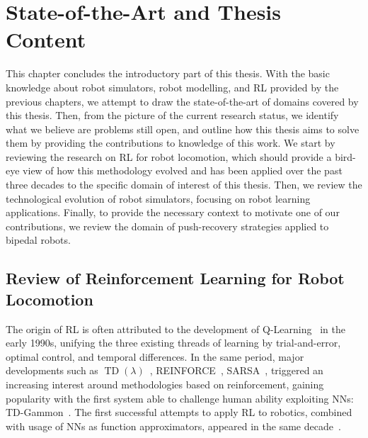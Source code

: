 \chapter{State-of-the-Art and Thesis Content}
\label{ch:sota}

This chapter concludes the introductory part of this thesis.
With the basic knowledge about robot simulators, robot modelling, and \ac{RL} provided by the previous chapters, we attempt to draw the state-of-the-art of domains covered by this thesis.
Then, from the picture of the current research status, we identify what we believe are problems still open, and outline how this thesis aims to solve them by providing the contributions to knowledge of this work.
We start by reviewing the research on \ac{RL} for robot locomotion, which should provide a bird-eye view of how this methodology evolved and has been applied over the past three decades to the specific domain of interest of this thesis.
Then, we review the technological evolution of robot simulators, focusing on robot learning applications.
Finally, to provide the necessary context to motivate one of our contributions, we review the domain of push-recovery strategies applied to bipedal robots.

\section{Review of Reinforcement Learning for Robot Locomotion}
\label{sec:review_rl_robot_locomotion}

The origin of \acl{RL} is often attributed to the development of Q-Learning~\parencite{watkins_christopher_learning_1989} in the early 1990s, unifying the three existing threads of learning by trial-and-error, optimal control, and temporal differences.
In the same period, major developments such as $\operatorname{TD}(\lambda)$~\parencite{sutton_learning_1988}, REINFORCE~\parencite{williams_simple_1992}, SARSA~\parencite{rummery_-line_1994}, \etc triggered an increasing interest around methodologies based on reinforcement, gaining popularity with the first system able to challenge human ability exploiting \acp{NN}: TD-Gammon~\parencite{tesauro_td-gammon_1994}.
The first successful attempts to apply \acl{RL} to robotics, combined with usage of \acp{NN} as function approximators, appeared in the same decade~\parencite{lin_reinforcement_1993, gullapalli_acquiring_1994, benbrahim_biped_1997}.

